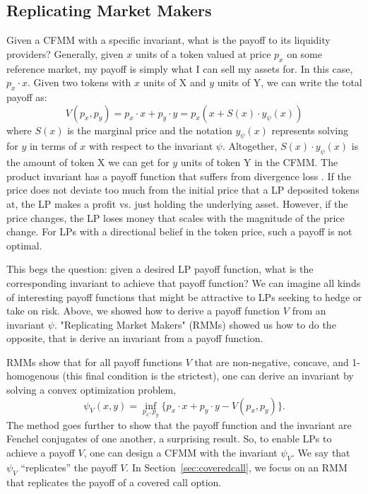 \documentclass[hidelinks, 12pt]{article}
\begin{document}
\subsection{Replicating Market Makers}
\label{sec:rmm}

Given a CFMM with a specific invariant, what is the payoff to its liquidity providers? Generally, given $x$ units of a token valued at price $p_x$ on some reference market, my payoff is simply what I can sell my assets for. In this case,  $p_x \cdot x$. Given two tokens with $x$ units of X and $y$ units of Y, we can write the total payoff as:
\[V(p_x, p_y) = p_x\cdot x + p_y \cdot y = p_x (x + S(x)\cdot y_\psi(x))\]
where $S(x)$ is the marginal price and the notation $y_\psi(x)$ represents solving for $y$ in terms of $x$ with respect to the invariant $\psi$.
Altogether, $S(x)\cdot y_\psi(x)$ is the amount of token X we can get for $y$ units of token Y in the CFMM.
The product invariant has a payoff function that suffers from divergence loss \cite{angeris2019analysis}. If the price does not deviate too much from the initial price that a LP deposited tokens at, the LP makes a profit vs. just holding the underlying asset. However, if the price changes, the LP loses money that scales with the magnitude of the price change. For LPs with a directional belief in the token price, such a payoff is not optimal.


This begs the question: given a desired LP payoff function, what is the corresponding invariant to achieve that payoff function? We can imagine all kinds of interesting payoff functions that might be attractive to LPs seeking to hedge or take on risk.  Above, we showed how to derive a payoff function $V$ from an invariant $\psi$. "Replicating Market Makers" (RMMs) showed us how to do the opposite, that is derive an invariant from a payoff function.


RMMs \cite{angeris2021replicating} show that for all payoff functions $V$ that are non-negative, concave, and 1-homogenous (this final condition is the strictest), one can derive an invariant by solving a convex optimization problem,
\[ \psi_V(x, y) = \inf_{p_x, p_y} \{ p_x \cdot x + p_y \cdot y - V(p_x, p_y) \}. \]
The method goes further to show that the payoff function and the invariant are Fenchel conjugates of one another, a surprising result. So, to enable LPs to achieve a payoff $V$, one can design a CFMM with the invariant $\psi_V$. We say that $\psi_V$ ``replicates'' the payoff $V$. In Section~\ref{sec:coveredcall}, we focus on an RMM that replicates the payoff of a covered call option.
\end{document}
